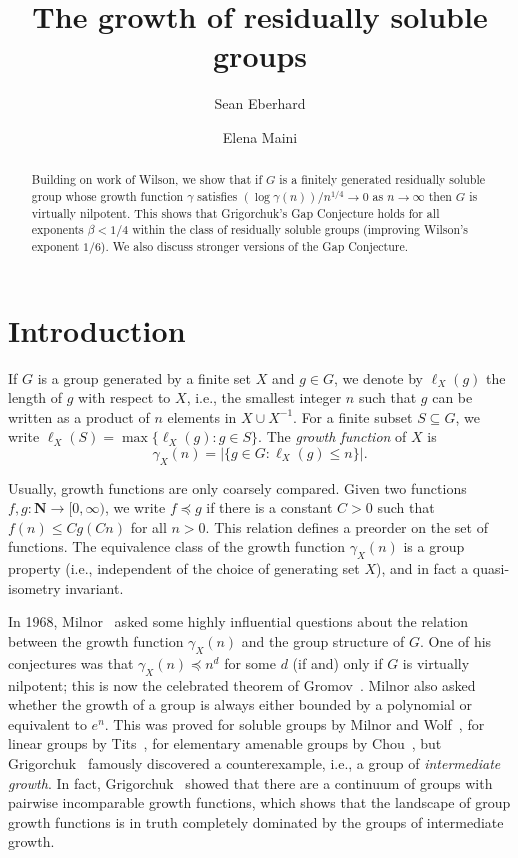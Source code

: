 \documentclass[11pt,reqno]{amsart}
\author{Sean Eberhard}
\author{Elena Maini}
\numberwithin{equation}{section}
\theoremstyle{definition}
\theoremstyle{remark}
\def\N{\mathbf{N}}
\numberwithin{equation}{section}
\begin{document}
\title{The growth of residually soluble groups}


\begin{abstract}
    Building on work of Wilson, we show that if $G$ is a finitely generated residually soluble group whose growth function $\gamma$ satisfies $(\log \gamma(n))/ n^{1/4} \to 0$ as $n \to \infty$ then $G$ is virtually nilpotent.
    This shows that Grigorchuk's Gap Conjecture holds for all exponents $\beta < 1/4$ within the class of residually soluble groups (improving Wilson's exponent $1/6$).
    We also discuss stronger versions of the Gap Conjecture.
\end{abstract}





\maketitle

\section{Introduction}
If $G$ is a group generated by a finite set $X$ and $g\in G$, we denote by $\ell_X(g)$ the length of $g$ with respect to $X$, i.e., the smallest integer $n$ such that $g$ can be written as a product of $n$ elements in $X \cup X^{-1}$. For a finite subset $S\subseteq G$, we write $\ell_X(S)=\max\{\ell_X(g): g\in S\}$.
The \emph{growth function} of $X$ is
\begin{equation*}
    \gamma_X(n) = |\{ g\in G:\ell_X(g)\le n \}|.
\end{equation*}

Usually, growth functions are only coarsely compared. Given two functions $f, g : \N \to [0, \infty)$, we write $f \preceq g$ if there is a constant $C > 0$ such that $f(n) \le C g(Cn)$ for all $n > 0$.
This relation defines a preorder on the set of functions.
The equivalence class of the growth function $\gamma_X(n)$ is a group property (i.e., independent of the choice of generating set $X$), and in fact a quasi-isometry invariant.

In 1968, Milnor~\cite{milnor-5603} asked some highly influential questions about the relation between the growth function $\gamma_X(n)$ and the group structure of $G$.
One of his conjectures was that $\gamma_X(n) \preceq n^d$ for some $d$ (if and) only if $G$ is virtually nilpotent;
this is now the celebrated theorem of Gromov~\cite{Gromov}.
Milnor also asked whether the growth of a group is always either bounded by a polynomial or equivalent to $e^n$.
This was proved for soluble groups by Milnor and Wolf~\cites{Milnor,Wolf},
for linear groups by Tits~\cite{Tits},
for elementary amenable groups by Chou~\cite{chou},
but Grigorchuk~\cite{Grig-group-of-intermediate-growth} famously discovered a counterexample, i.e., a group of \emph{intermediate growth}.
In fact, Grigorchuk~\cite{gen-grig} showed that there are a continuum of groups with pairwise incomparable growth functions,
which shows that the landscape of group growth functions is in truth completely dominated by the groups of intermediate growth.
\end{document}
